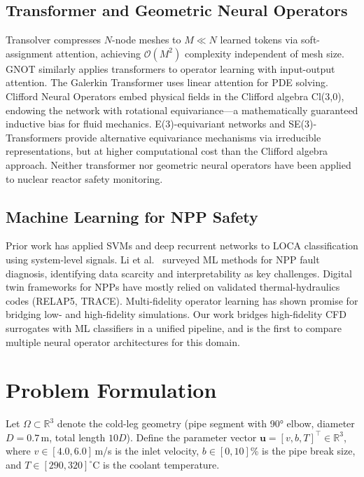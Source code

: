 \documentclass[conference]{IEEEtran}
\begin{document}
\subsection{Transformer and Geometric Neural Operators}
Transolver \cite{wu2024transolver} compresses $N$-node meshes to $M \ll N$ learned tokens via soft-assignment attention, achieving $\mathcal{O}(M^2)$ complexity independent of mesh size. GNOT \cite{hao2023gnot} similarly applies transformers to operator learning with input-output attention. The Galerkin Transformer \cite{cao2021galerkin} uses linear attention for PDE solving. Clifford Neural Operators \cite{brandstetter2023clifford} embed physical fields in the Clifford algebra Cl(3,0), endowing the network with rotational equivariance---a mathematically guaranteed inductive bias for fluid mechanics. E(3)-equivariant networks \cite{thomas2018e3nn} and SE(3)-Transformers \cite{fuchs2020se3} provide alternative equivariance mechanisms via irreducible representations, but at higher computational cost than the Clifford algebra approach. Neither transformer nor geometric neural operators have been applied to nuclear reactor safety monitoring.

\subsection{Machine Learning for NPP Safety}
Prior work has applied SVMs \cite{song2018} and deep recurrent networks \cite{choi2019} to LOCA classification using system-level signals. Li et al.~\cite{li2022npp_ml} surveyed ML methods for NPP fault diagnosis, identifying data scarcity and interpretability as key challenges. Digital twin frameworks for NPPs \cite{grieves2014, liu2022npp} have mostly relied on validated thermal-hydraulics codes (RELAP5, TRACE). Multi-fidelity operator learning \cite{lu2022multifidelity} has shown promise for bridging low- and high-fidelity simulations. Our work bridges high-fidelity CFD surrogates with ML classifiers in a unified pipeline, and is the first to compare multiple neural operator architectures for this domain.

\section{Problem Formulation}
\label{sec:problem}

Let $\Omega \subset \mathbb{R}^3$ denote the cold-leg geometry (pipe segment with 90° elbow, diameter $D = 0.7$\,m, total length $10D$). Define the parameter vector $\bm{u} = [v, b, T]^\top \in \mathbb{R}^3$, where $v \in [4.0, 6.0]$\,m/s is the inlet velocity, $b \in [0, 10]$\% is the pipe break size, and $T \in [290, 320]^\circ$C is the coolant temperature.
\end{document}
